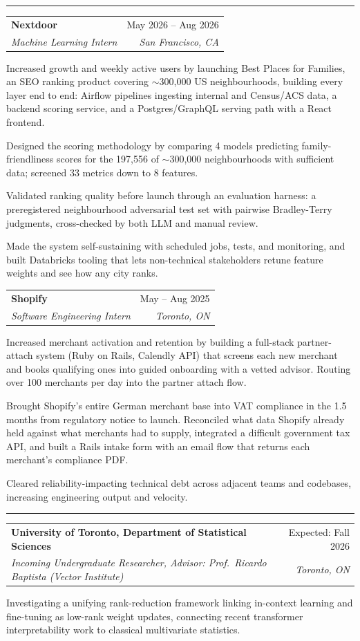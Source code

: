 \documentclass[letterpaper,10pt]{article}
\makeatletter
\newcommand{\Section}[1]{\vspace{4pt}{\large\bfseries #1}\vspace{1pt}\hrule\vspace{3pt}}
\newcommand{\entry}[4]{%
  \vspace{2pt}%
  \begin{tabular*}{\textwidth}{@{}l@{\extracolsep{\fill}}r@{}}
    \textbf{#1} & #2 \\
    \textit{#3} & \textit{#4} \\
  \end{tabular*}\vspace{-4pt}}
\newenvironment{bullets}%
  {\begin{list}{\textbullet}{%
     \setlength{\leftmargin}{1.3em}\setlength{\labelsep}{0.5em}%
     \setlength{\itemsep}{1.5pt}\setlength{\topsep}{2pt}%
     \setlength{\parsep}{0pt}\setlength{\partopsep}{0pt}}}%
  {\end{list}}
\makeatother
\begin{document}
\Section{Experience}
\entry{Nextdoor}{May 2026 -- Aug 2026}{Machine Learning Intern}{San Francisco, CA}
\begin{bullets}
  \item Increased growth and weekly active users by launching Best Places for Families, an SEO ranking product covering $\sim$300,000 US neighbourhoods, building every layer end to end: Airflow pipelines ingesting internal and Census/ACS data, a backend scoring service, and a Postgres/GraphQL serving path with a React frontend.
  \item Designed the scoring methodology by comparing 4 models predicting family-friendliness scores for the 197,556 of $\sim$300,000 neighbourhoods with sufficient data; screened 33 metrics down to 8 features.
  \item Validated ranking quality before launch through an evaluation harness: a preregistered neighbourhood adversarial test set with pairwise Bradley-Terry judgments, cross-checked by both LLM and manual review.
  \item Made the system self-sustaining with scheduled jobs, tests, and monitoring, and built Databricks tooling that lets non-technical stakeholders retune feature weights and see how any city ranks.
\end{bullets}
\entry{Shopify}{May -- Aug 2025}{Software Engineering Intern}{Toronto, ON}
\begin{bullets}
   \item Increased merchant activation and retention by building a full-stack partner-attach system (Ruby on Rails, Calendly API) that screens each new merchant and books qualifying ones into guided onboarding with a vetted advisor. Routing over 100 merchants per day into the partner attach flow.
  \item Brought Shopify's entire German merchant base into VAT compliance in the 1.5 months from regulatory notice to launch. Reconciled what data Shopify already held against what merchants had to supply, integrated a difficult government tax API, and built a Rails intake form with an email flow that returns each merchant's compliance PDF.
  \item Cleared reliability-impacting technical debt across adjacent teams and codebases, increasing engineering output and velocity.
\end{bullets}

\Section{Research}
\entry{University of Toronto, Department of Statistical Sciences}{Expected: Fall 2026}%
      {Incoming Undergraduate Researcher, Advisor: Prof.\ Ricardo Baptista (Vector Institute)}{Toronto, ON}
\begin{bullets}
  \item Investigating a unifying rank-reduction framework linking in-context learning and fine-tuning as low-rank weight updates, connecting recent transformer interpretability work to classical multivariate statistics.
\end{bullets}
\end{document}
